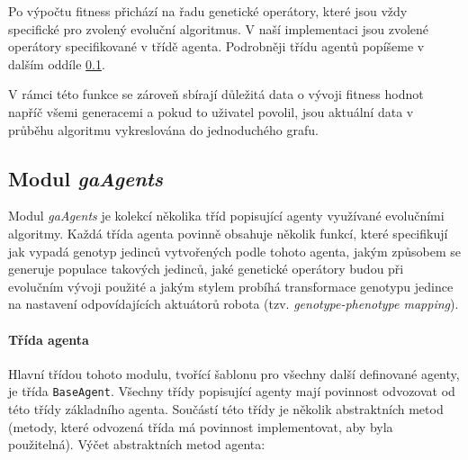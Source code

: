 Po výpočtu fitness přichází na řadu genetické operátory, které jsou vždy
specifické pro zvolený evoluční algoritmus. V naší implementaci jsou zvolené
operátory specifikované v třídě agenta. Podrobněji třídu agentů
popíšeme v dalším oddíle \ref{imp:gaAgents}.

V rámci této funkce se zároveň sbírají důležitá data o vývoji fitness hodnot
napříč všemi generacemi a pokud to uživatel povolil, jsou aktuální data v
průběhu algoritmu vykreslována do jednoduchého grafu.

\subsection{Modul \emph{gaAgents}} \label{imp:gaAgents}
Modul \emph{gaAgents} je kolekcí několika tříd popisující agenty využívané
evolučními algoritmy. Každá třída agenta povinně obsahuje několik funkcí, které
specifikují jak vypadá genotyp jedinců vytvořených podle tohoto agenta, jakým
způsobem se generuje populace takových jedinců, jaké genetické operátory budou
při evolučním vývoji použité a jakým stylem probíhá transformace genotypu
jedince na nastavení odpovídajících aktuátorů robota (tzv.
\emph{genotype-phenotype mapping}). 

\paragraph{Třída agenta}
Hlavní třídou tohoto modulu, tvořící šablonu pro všechny další definované
agenty, je třída \texttt{BaseAgent}. Všechny třídy popisující agenty mají
povinnost odvozovat od této třídy základního agenta. Součástí této třídy je
několik abstraktních metod (metody, které odvozená třída má povinnost
implementovat, aby byla použitelná). Výčet abstraktních metod agenta:

